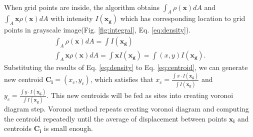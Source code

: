 \documentclass[11pt]{article}
\begin{document}
\\When grid points are inside, the algorithm obtains $\int_{A}\rho(\mathbf{x})dA$ and $\int_{A}\mathbf{x}\rho(\mathbf{x})dA$ with intensity $I(\mathbf{x_g})$ which has corresponding location to grid points in grayscale image(Fig. \ref{fig:integral}, Eq. \ref{eq:density}).
\begin{equation}\label{eq:density} %
\begin{gathered}
\int_{A}\rho(\mathbf{x})dA=\int I(\mathbf{x_g})\\
\int_{A}\mathbf{x}\rho(\mathbf{x})dA=\int \mathbf{x}I(\mathbf{x_g})=\int (x, y)I(\mathbf{x_g}).
\end{gathered}
\end{equation}
Substituting the results of Eq. \ref{eq:density} to Eq. \ref{eq:centroid}, we can generate new centroid $\mathbf{C_i}=(x_c, y_c)$,
which satisfies that $x_c=\frac{\int x\cdot I(\mathbf{x_g})}{\int I(\mathbf{x_g})}$ and $y_c=\frac{\int y\cdot I(\mathbf{x_g})}{\int I(\mathbf{x_g})}$.%
This new centroids will be fed as sites into creating voronoi diagram step. Voronoi method repeats creating voronoi diagram and computing the centroid repeatedly until the average of displacement between points $\mathbf{x_i}$ and centroids $\mathbf{C_i}$ is small enough.
\end{document}
